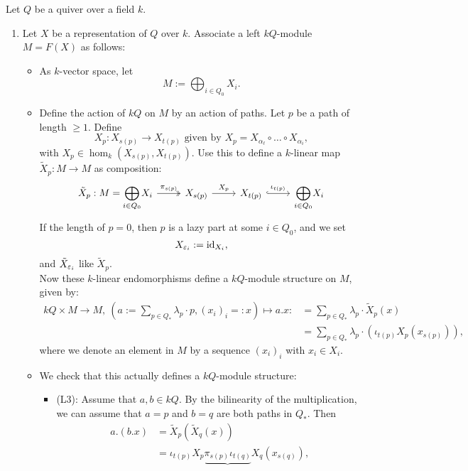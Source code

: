 Let $Q$ be a quiver over a field $k$.
\begin{rem}\label{3:qfunct}
  \begin{enumerate}
    \item Let $X$ be a representation of $Q$ over $k$. Associate a left $kQ$-module $M=F(X)$ as follows:
    \begin{itemize}
      \item As $k$-vector space, let
      \[
      M:= \bigoplus_{i\in Q_0}X_i .
      \]
      \item Define the action of $kQ$ on $M$ by an action of paths. Let $p$ be a path of length $\geq 1$. Define
      \[
      X_p: X_{s(p)}\to X_{t(p)}\text{ given by }X_p=X_{\alpha_{\ell}}\circ \hdots \circ X_{\alpha_i},
      \]
      \color{purple}with $X_p\in \hom_k(X_{s(p)},X_{t(p)})$\color{black}. Use this to define a $k$-linear map $\tilde{X}_p:M\to M$ as composition:
      \[
      \begin{tikzcd}
        \tilde{X}_p:M={\displaystyle \bigoplus_{i\in Q_0}}X_i\ar[\surarr]{r}{\pi_{s(p)}}&X_{s(p)}\ar{r}{X_p}&X_{t(p)}\ar[\embarr]{r}{\iota_{t(p)}}&{\displaystyle \bigoplus_{i\in Q_0}}X_i
      \end{tikzcd}
    \]
    If the length of $p=0$, \color{purple} then $p$ is a lazy part at some $i\in Q_0$\color{black}, and we set
    \[
    X_{\varepsilon_i}:= \operatorname{id}_{X_i},
    \]
    and $\tilde{X}_{\varepsilon_i}$ like $\tilde{X}_p$.\\
    Now these $k$-linear endomorphisms define a $kQ$-module structure on $M$, given by:
    \begin{align*}
    kQ\times M\to M,~\left(a:= \sum_{p\in Q_{\ast}}\lambda_p\cdot p,(x_i)_i=:x\right)\mapsto a.x:&=\sum_{p\in Q_{\ast}}\lambda_p\cdot \tilde{X}_p(x)\\&=\sum_{p\in Q_{\ast}}\lambda_p\cdot (\iota_{t(p)}X_p(x_{s(p)})),
    \end{align*}
    \color{purple} where we denote an element in $M$ by a sequence $(x_i)_i$ with $x_i\in X_i$.\color{black}
    \item We check that this actually defines a $kQ$-module structure:
    \begin{itemize}
      \item (L3): Assume that $a,b\in kQ$. By the bilinearity of the multiplication, we can assume that $a=p$ and $b=q$ are both paths in $Q_{\ast}$. Then
      \begin{align*}
        a.(b.x)&= \tilde{X}_p\left(\tilde{X}_q(x)\right)\\
               &= \iota_{t(p)}X_p\underbrace{\pi_{s(p)}\iota_{t(q)}}X_{q}(x_{s(q)}),

\end{align*}
\end{itemize}
\end{itemize}
\end{enumerate}
\end{rem}
